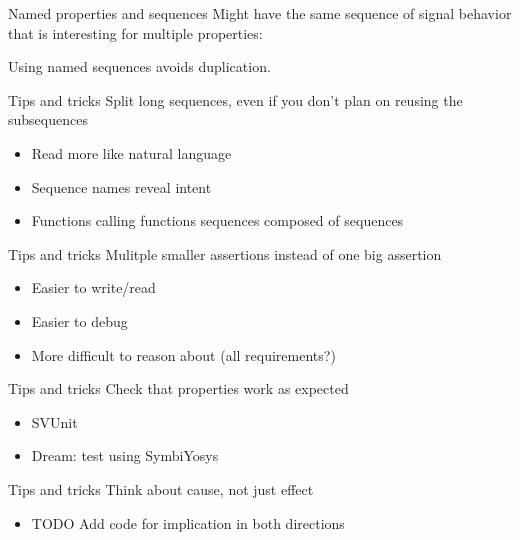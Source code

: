 \documentclass{beamer}
\begin{document}
\begin{frame}[fragile]{Named properties and sequences}
Might have the same sequence of signal behavior that is interesting for multiple properties:


Using named sequences avoids duplication.
\end{frame}


\begin{frame}{Tips and tricks}
Split long sequences, even if you don't plan on reusing the subsequences

\begin{itemize}
 \item Read more like natural language
 \item Sequence names reveal intent
 \item Functions calling functions \textrightarrow{} sequences composed of sequences
\end{itemize}
\end{frame}


\begin{frame}{Tips and tricks}
Mulitple smaller assertions instead of one big assertion

\begin{itemize}
 \item Easier to write/read
 \item Easier to debug
 \item More difficult to reason about (all requirements?)
\end{itemize}
\end{frame}


\begin{frame}{Tips and tricks}
Check that properties work as expected

\begin{itemize}
 \item SVUnit
 \item Dream: test using SymbiYosys
\end{itemize}
\end{frame}


\begin{frame}{Tips and tricks}
Think about cause, not just effect

\begin{itemize}
 \item TODO Add code for implication in both directions
\end{itemize}
\end{frame}
\end{document}
